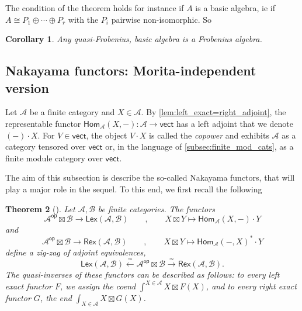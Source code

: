 \documentclass[11pt]{article}
\newtheorem{theorem}{Theorem}[section]
\newtheorem{corollary}[theorem]{Corollary}
\theoremstyle{definition}
\begin{document}
The condition of the theorem holds for instance if $A$ is a basic algebra, ie if $A \cong P_1 \oplus \cdots \oplus P_r$ with the $P_i$ pairwise non-isomorphic. So

\begin{corollary}
Any quasi-Frobenius, basic algebra is a Frobenius algebra.
\end{corollary}


\subsection{Nakayama functors: Morita-independent version}

Let $\mathcal{A}$ be a finite category and $X \in \mathcal{A}$. By \cref{lem:left_exact=right_adjoint}, the representable functor  $\mathsf{Hom}_\mathcal{A}(X,-): \mathcal{A} \longrightarrow \mathsf{vect}$  has a left adjoint that we denote $(-) \cdot X$. For $V \in \mathsf{vect}$, the object $V \cdot X$ is called the \emph{copower} and exhibits $\mathcal{A}$ as a category tensored over $\mathsf{vect}$ or, in the language of \cref{subsec:finite_mod_cats}, as a finite module category over $\mathsf{vect}$.


The aim of this subsection is describe the so-called  Nakayama functors, that will play a major role in the sequel. To this end, we first recall the following 

\begin{theorem}[{\cite[Theorem 3.2]{fss}}]\label{thm:fss_zig_zag}
Let $\mathcal{A}, \mathcal{B}$ be finite categories. The functors
$$ \mathcal{A}^\mathsf{op} \boxtimes \mathcal{B} \longrightarrow  \mathsf{Lex}(\mathcal{A},\mathcal{B})  \qquad , \qquad X \boxtimes Y \longmapsto \mathsf{Hom}_\mathcal{A} (X,-) \cdot Y $$
and
$$ \mathcal{A}^\mathsf{op} \boxtimes \mathcal{B} \longrightarrow \mathsf{Rex}(\mathcal{A},\mathcal{B})  \qquad , \qquad X \boxtimes Y \longmapsto \mathsf{Hom}_\mathcal{A} (-,X)^* \cdot Y $$
define a zig-zag of adjoint equivalences,
\begin{equation}\label{eq:fss_zig_zag}
\mathsf{Lex}(\mathcal{A},\mathcal{B}) \overset{\simeq}{\longleftarrow} \mathcal{A}^\mathsf{op} \boxtimes \mathcal{B} \overset{\simeq}{\longrightarrow}  \mathsf{Rex}(\mathcal{A},\mathcal{B}).
\end{equation}
The quasi-inverses of these functors can be described as follows: to every left exact functor $F$, we assign  the coend $\int^{X \in \mathcal{A}} X \boxtimes F(X)$, and to every right exact functor $G$, the end $\int_{X \in \mathcal{A}} X \boxtimes G(X)$.
\end{theorem}
\end{document}
